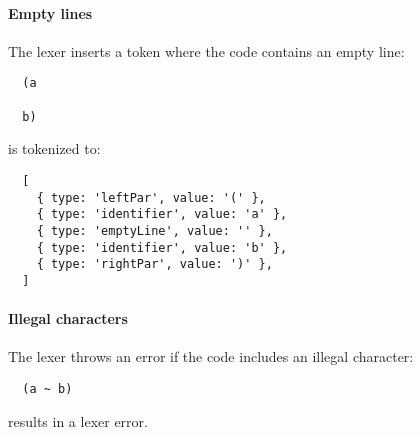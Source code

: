 \paragraph{Empty lines}
The lexer inserts a token
where the code contains an empty line:
\begin{verbatim}
  (a

  b)
\end{verbatim}
is tokenized to:
\begin{verbatim}
  [
    { type: 'leftPar', value: '(' },
    { type: 'identifier', value: 'a' },
    { type: 'emptyLine', value: '' },
    { type: 'identifier', value: 'b' },
    { type: 'rightPar', value: ')' },
  ]
\end{verbatim}

\paragraph{Illegal characters}
The lexer throws an error
if the code includes an illegal character:
\begin{verbatim}
  (a ~ b)
\end{verbatim}
results in a lexer error.
